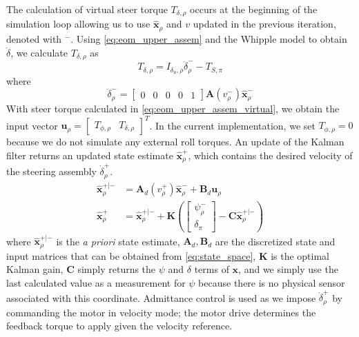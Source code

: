 \documentclass{icsc}
\newcommand{\state}{\bm{x}}
\newcommand{\sysInput}{\bm{u}}
\newcommand{\stateMat}{\bm{A}}
\newcommand{\inputMat}{\bm{B}}
\newcommand{\outputMat}{\bm{C}}
\newcommand{\stateEst}{\hat{\bm{x}}}
\newcommand{\yaw}{\psi}
\newcommand{\roll}{\phi}
\newcommand{\steer}{\delta}
\newcommand{\steerRate}{\dot{\delta}}
\newcommand{\steerAccel}{\ddot{\delta}}
\newcommand{\pre}{-}
\newcommand{\post}{+}
\newcommand{\virtual}{\rho}
\newcommand{\physical}{\pi}
\begin{document}
The calculation of virtual steer torque $T_{\steer,\virtual}$ occurs at the beginning of the simulation loop allowing us
to use $\stateEst_\virtual$ and $v$ updated in the previous iteration, denoted with $^{\pre}$.
Using \autoref{eq:eom_upper_assem} and the Whipple model to obtain $\steerAccel$, we calculate $T_{\steer,\virtual}$ as
\begin{equation}
    T_{\steer,\virtual} = I_{\steer_u,\virtual} \steerAccel_\virtual^\pre - T_{S,\physical} \label{eq:eom_upper_assem_virtual}
\end{equation}
where
\begin{equation}
    \steerAccel_\virtual^\pre = \begin{bmatrix} 0 & 0 & 0 & 0 & 1 \end{bmatrix}
    \stateMat{( v_\virtual^\pre)} \stateEst_\virtual^\pre \label{eq:steer_accel_virtual_pre}
\end{equation}
With steer torque calculated in \autoref{eq:eom_upper_assem_virtual}, we obtain the input vector
$\sysInput_\virtual = \begin{bmatrix} T_{\roll,\virtual} & T_{\steer,\virtual} \end{bmatrix}^T$.
In the current implementation, we set $T_{\roll,\virtual} = 0$ because we do not simulate any external roll torques.
An update of the Kalman filter returns an updated state estimate $\stateEst^\post_\virtual$, which contains the desired
velocity of the steering assembly $\steerRate^\post_\virtual$.
\begin{equation}
\begin{aligned}
\label{eq:kalman_update}
    \stateEst^{\post|\pre}_\virtual &= \stateMat_d{(v^\post_\virtual)} \stateEst^\pre_\virtual + \inputMat_d \sysInput_\virtual\\
    \stateEst^\post_\virtual &= \stateEst^{\post|\pre}_\virtual + \bm{K}(
            \begin{bmatrix} \yaw^\pre_\virtual \\ \steer_\physical \end{bmatrix} -
                \outputMat \stateEst^{\post|\pre}_\virtual)
\end{aligned}
\end{equation}
where $\stateEst^{\post|\pre}_\virtual$ is the \emph{a priori} state estimate,
$\stateMat_d, \inputMat_d$ are the discretized state and input matrices that can be obtained from \autoref{eq:state_space},
$\bm{K}$ is the optimal Kalman gain,
$\outputMat$ simply returns the $\yaw$ and $\steer$ terms of $\state$,
and we simply use the last calculated value as a measurement for $\yaw$ because there is no physical sensor associated
with this coordinate.
Admittance control is used as we impose $\steerRate^\post_\virtual$ by commanding the motor in velocity mode;
the motor drive determines the feedback torque to apply given the velocity reference.
\end{document}
